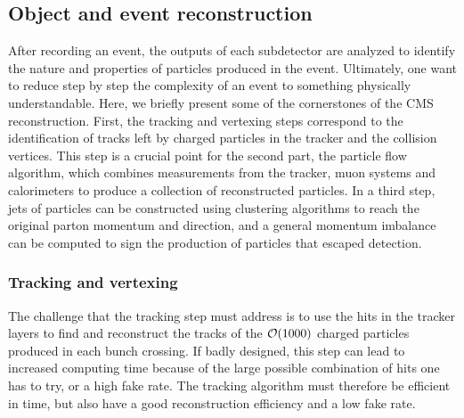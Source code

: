         \subsection{Object and event reconstruction}

        After recording an event, the outputs of each subdetector
        are analyzed to identify the nature and properties of particles produced in the
        event. Ultimately, one want to reduce step by step the complexity of an event to
        something physically understandable. Here, we briefly present some of the
        cornerstones of the CMS reconstruction. First, the tracking and vertexing steps
        correspond to the identification of tracks left by charged particles in the tracker
        and the collision vertices. This step is a crucial point for the second part, the
        particle flow algorithm, which combines measurements from the tracker, muon systems
        and calorimeters to produce a collection of reconstructed particles. In a third step,
        jets of particles can be constructed using clustering algorithms to reach the original
        parton momentum and direction, and a general momentum imbalance can be computed
        to sign the production of particles that escaped detection.

            \subsubsection{Tracking and vertexing \label{sec:trackingAndVertexing}}

        The challenge that the tracking step must address is to use the hits in the
        tracker layers to find and reconstruct the tracks of the $\mathcal{O}(1000)$ charged
        particles produced in each bunch crossing. If badly designed, this step can lead
        to increased computing time because of the large possible combination of hits one
        has to try, or a high fake rate. The tracking algorithm must therefore be efficient
        in time, but also have a good reconstruction efficiency and a low fake rate.

